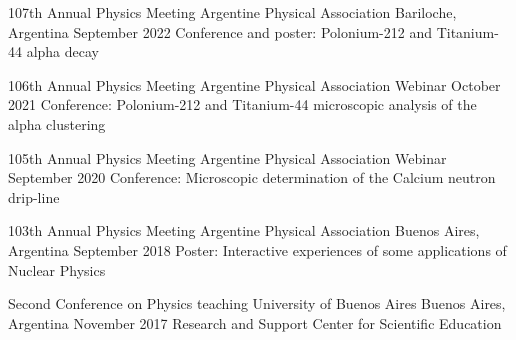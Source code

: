 

\begin{cventries}

  \cventry
    {107th Annual Physics Meeting} %
    {Argentine Physical Association} %
    {Bariloche, Argentina} %
    {September 2022} %
    {Conference and poster: Polonium-212 and Titanium-44 alpha decay} %

  \cventry
    {106th Annual Physics Meeting} %
    {Argentine Physical Association} %
    {Webinar} %
    {October 2021} %
    {Conference: Polonium-212 and Titanium-44  microscopic analysis of the alpha clustering} %

  \cventry
    {105th Annual Physics Meeting} %
    {Argentine Physical Association} %
    {Webinar} %
    {September 2020} %
    {Conference: Microscopic determination of the Calcium neutron drip-line} %

  \cventry
    {103th Annual Physics Meeting} %
    {Argentine Physical Association} %
    {Buenos Aires, Argentina} %
    {September 2018} %
    {Poster: Interactive experiences of some applications of Nuclear Physics} %

  \cventry
    {Second Conference on Physics teaching} %
    {University of Buenos Aires} %
    {Buenos Aires, Argentina} %
    {November 2017} %
    {Research and Support Center for Scientific Education} %

\end{cventries}
